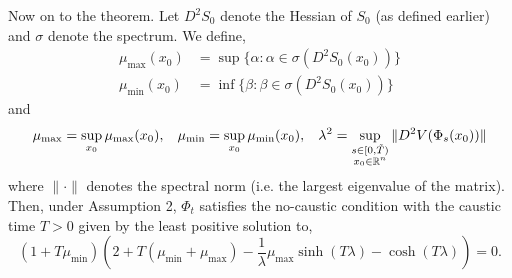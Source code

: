 \documentclass[a4paper,12pt,draft]{report}
\begin{document}
Now on to the theorem.
\theorem
{
Let $D^2S_0$ denote the Hessian of $S_0$ (as defined earlier) and $\sigma$ denote the spectrum.  We define,
\begin{align}
\mu_{\mathrm{max}}(x_0) & = \sup\{\alpha : \alpha \in \sigma (D^2S_0(x_0)) \}\nonumber\\
\mu_{\mathrm{min}}(x_0) & = \inf\{\beta : \beta \in \sigma (D^2S_0(x_0)) \}\nonumber
\end{align}
and
$$
\mu_{\mathrm{max}} = \sup_{x_0}\mu_{\mathrm{max}}(x_0),
\hspace{3mm}
\mu_{\mathrm{min}} = \sup_{x_0}\mu_{\mathrm{min}}(x_0),
\hspace{3mm}
\lambda^2 = \sup_{\substack{s \in [0, \tilde{T})\\x_0 \in \mathbb{R}^n}}\|D^2V(\Phi_s(x_0))\|
$$
where $\|\cdot\|$ denotes the spectral norm (i.e. the largest eigenvalue of the matrix).  Then, under Assumption 2, $\Phi_t$ satisfies the no-caustic condition with the caustic time $T > 0$ given by the least positive solution to,
$$
(1 + T\mu_{\mathrm{min}})\left(2 + T(\mu_{\mathrm{min}} + \mu_{\mathrm{max}}) - \frac{1}{\lambda}\mu_{\mathrm{max}}\sinh(T\lambda) - \cosh(T\lambda)\right) = 0.
$$
}
\proof
\end{document}

